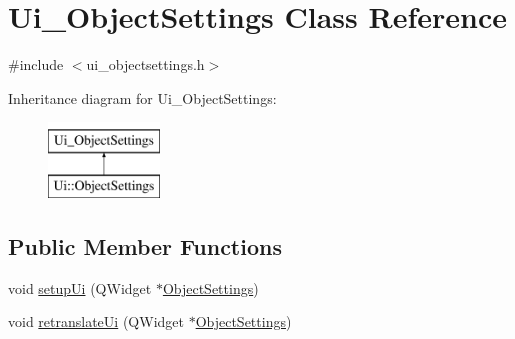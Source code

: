 \hypertarget{class_ui___object_settings}{}\section{Ui\+\_\+\+Object\+Settings Class Reference}
\label{class_ui___object_settings}


{\ttfamily \#include $<$ui\+\_\+objectsettings.\+h$>$}

Inheritance diagram for Ui\+\_\+\+Object\+Settings\+:\begin{figure}[H]
\begin{center}
\leavevmode
\includegraphics[height=2.000000cm]{class_ui___object_settings}
\end{center}
\end{figure}
\subsection*{Public Member Functions}
\begin{DoxyCompactItemize}
\item 
void \hyperlink{class_ui___object_settings_a9f6ddc78b023afd31f9ee2bb18d3167d}{setup\+Ui} (Q\+Widget $\ast$\hyperlink{class_object_settings}{Object\+Settings})
\item 
void \hyperlink{class_ui___object_settings_a412f3bf2df2d7bbcc4e67bf038566aaa}{retranslate\+Ui} (Q\+Widget $\ast$\hyperlink{class_object_settings}{Object\+Settings})
\end{DoxyCompactItemize}
